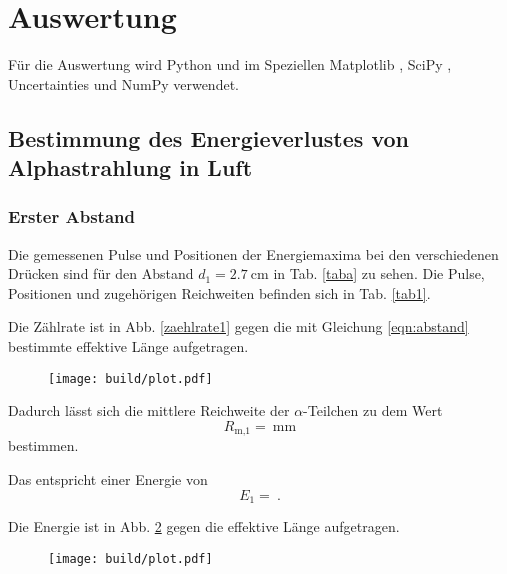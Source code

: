 \section{Auswertung}
\label{sec:Auswertung}

Für die Auswertung wird Python und im Speziellen Matplotlib \cite{matplotlib}, SciPy \cite{scipy}, Uncertainties \cite{uncertainties} und NumPy \cite{numpy} verwendet.

\subsection{Bestimmung des Energieverlustes von Alphastrahlung in Luft}

\subsubsection{Erster Abstand}
Die gemessenen Pulse und Positionen der Energiemaxima bei den verschiedenen Drücken sind für den Abstand $d_1 = \SI{2.7}{\centi\meter}$ in Tab. \ref{taba} zu sehen. Die Pulse, Positionen und zugehörigen Reichweiten befinden sich in Tab. \ref{tab1}. 




\noindent Die Zählrate ist in Abb. \ref{zaehlrate1} gegen die mit Gleichung \eqref{eqn:abstand} bestimmte effektive Länge aufgetragen.
\begin{figure}
    \centering
    \texttt{[image: build/plot.pdf]}
    \caption{}
    \label{fig:zaehlrate1}
\end{figure}

\noindent Dadurch lässt sich die mittlere Reichweite der $\alpha$-Teilchen zu dem Wert %
\begin{equation*}
    R_\text{m,1} = \SI{}{\milli\meter}
\end{equation*}
bestimmen.

\noindent Das entspricht einer Energie von %
\begin{equation*}
    E_1 = \SI{}{}.
\end{equation*}

Die Energie ist in Abb. \ref{fig:energie1} gegen die effektive Länge aufgetragen.
\begin{figure}
    \centering
    \texttt{[image: build/plot.pdf]}
    \caption{}
    \label{fig:energie1}
\end{figure}

